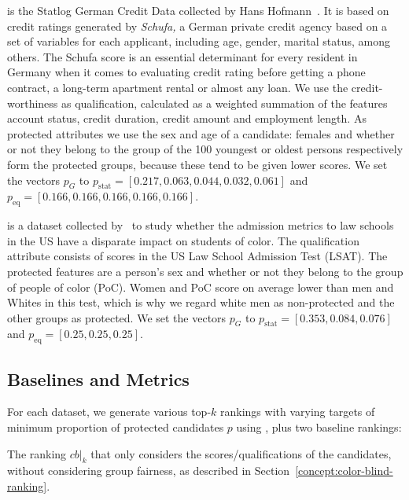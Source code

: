  is the Statlog German Credit Data collected by Hans Hofmann~\cite{lichman_2013_uci}.
%
It is based on credit ratings generated by \emph{Schufa,} a German private credit agency based on a set of variables for each applicant, including age, gender, marital status, among others. The Schufa score is an essential determinant for every resident in Germany when it comes to evaluating credit rating before getting a phone contract, a long-term apartment rental or almost any loan.
%
We use the credit-worthiness as qualification, calculated as a weighted summation of the features account status, credit duration, credit amount and employment length.
%
As protected attributes we use the sex and age of a candidate: females and whether or not they belong to the group of the 100 youngest or oldest persons respectively form the protected groups, because these tend to be given lower scores.
%
We set the vectors $p_G$ to $p_{\text{stat}}=[0.217,0.063,0.044,0.032,0.061]$ and $p_{\text{eq}}=[0.166,0.166,0.166,0.166,0.166]$.


 is a dataset collected by~\citet{wightman1998lsac} to study whether the admission metrics to law schools in the US have a disparate impact on students of color.
%
The qualification attribute consists of scores in the US Law School Admission Test (LSAT).
%
The protected features are a person's sex and whether or not they belong to the group of people of color (PoC).
%
Women and PoC score on average lower than men and Whites in this test, which is why we regard white men as non-protected and the other groups as protected.
%
We set the vectors $p_G$ to $p_{\text{stat}}=[0.353,0.084,0.076]$ and $p_{\text{eq}}=[0.25,0.25,0.25]$.


\subsection{Baselines and Metrics}\label{sec:experiments-baselines}

For each dataset, we generate various top-$k$ rankings with varying targets of minimum proportion of protected candidates $p$ using \algoFAIR, plus two baseline rankings:

 The ranking $\textit{cb}|_k$ that only considers the scores/qualifications of the candidates, without considering group fairness, as described in Section~\ref{concept:color-blind-ranking}.

